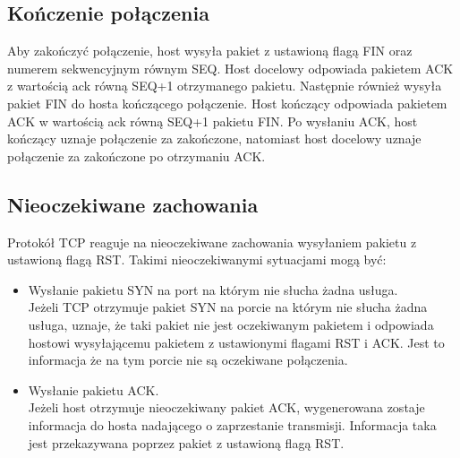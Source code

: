 		\subsection{Kończenie połączenia}
			Aby zakończyć połączenie, host wysyła pakiet z ustawioną flagą FIN oraz numerem sekwencyjnym równym SEQ.
			Host docelowy odpowiada pakietem ACK z wartością ack równą SEQ+1 otrzymanego pakietu.
			Następnie również wysyła pakiet FIN do hosta kończącego połączenie.
			Host kończący odpowiada pakietem ACK w wartością ack równą SEQ+1 pakietu FIN.
			Po wysłaniu ACK, host kończący uznaje połączenie za zakończone, natomiast host docelowy uznaje połączenie za zakończone po otrzymaniu ACK.
		\subsection{Nieoczekiwane zachowania}
			Protokół TCP reaguje na nieoczekiwane zachowania wysyłaniem pakietu z ustawioną flagą RST.
			Takimi nieoczekiwanymi sytuacjami mogą być:
			\begin{itemize}
			\item Wysłanie pakietu SYN na port na którym nie słucha żadna usługa.\\
				Jeżeli TCP otrzymuje pakiet SYN na porcie na którym nie słucha żadna usługa, uznaje, że taki pakiet nie jest oczekiwanym pakietem i odpowiada hostowi wysyłającemu pakietem z ustawionymi flagami RST i ACK.
				Jest to informacja że na tym porcie nie są oczekiwane połączenia.
			\item Wysłanie pakietu ACK.\\
				Jeżeli host otrzymuje nieoczekiwany pakiet ACK, wygenerowana zostaje informacja do hosta nadającego o zaprzestanie transmisji.
				Informacja taka jest przekazywana poprzez pakiet z ustawioną flagą RST.
			\end{itemize}

